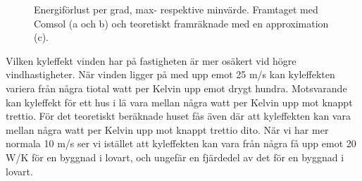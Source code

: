 \begin{figure}[hpbt]
\centering
{}
\vspace{5mm}


\caption{\label{fig:windenergyloss}Energiförlust per grad, max- respektive minvärde.
Framtaget med Comsol (a och b) och teoretiskt framräknade med en approximation (c).}
\end{figure}

Vilken kyleffekt vinden har på fastigheten är mer osäkert vid högre vindhastigheter. När vinden
 ligger på med upp emot 25 m/s kan kyleffekten variera från några tiotal watt per Kelvin upp 
 emot drygt hundra. Motsvarande kan kyleffekt för ett hus i lä vara mellan några watt per 
 Kelvin upp mot knappt trettio. För det teoretiskt beräknade huset fås även där att kyleffekten 
 kan vara mellan några watt per Kelvin upp mot knappt trettio dito. När vi har mer normala 10 
 m/s ser vi istället att kyleffekten kan vara från några få upp emot 20 W/K för en byggnad i 
 lovart, och ungefär en fjärdedel av det för en byggnad i lovart.